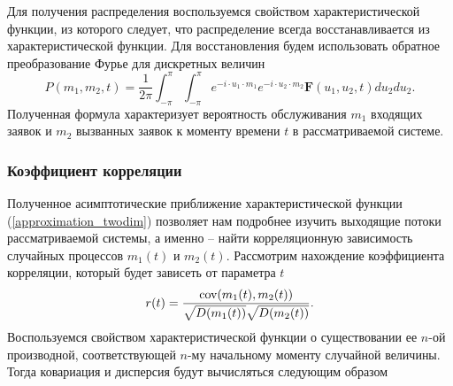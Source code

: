 Для получения распределения воспользуемся свойством характеристической функции, из которого следует, что распределение всегда восстанавливается из характеристической функции. Для восстановления будем использовать обратное преобразование Фурье для дискретных величин
\begin{equation*}
	P(m_{1},m_{2},t) = \dfrac{1}{2\pi}\int_{-\pi}^{\pi}\int_{-\pi}^{\pi} e^{-i \cdot u_{1} \cdot m_{1}} e^{-i \cdot u_{2} \cdot m_{2}}\boldsymbol{F}(u_{1},u_{2},t)du_{2}du_{2}.
\end{equation*}
Полученная формула характеризует вероятность обслуживания $m_{1}$ входящих заявок и $m_{2}$ вызванных заявок к моменту времени $t$ в рассматриваемой системе.

\subsubsection{Коэффициент корреляции}
Полученное асимптотические приближение характеристической функции (\ref{approximation_twodim}) позволяет нам подробнее изучить выходящие потоки рассматриваемой системы, а именно – найти корреляционную зависимость случайных процессов $m_{1}(t)$ и $m_{2}(t)$.
Рассмотрим нахождение коэффициента корреляции, который будет зависеть от параметра $t$
\begin{equation*}
	r(t) = \frac{\textnormal{cov}(m_{1}(t),m_{2}(t))}{\sqrt{D(m_{1}(t))}\sqrt{D(m_{2}(t))}}.
\end{equation*}
Воспользуемся свойством характеристической функции о существовании ее $n$-ой производной, соответствующей $n$-му начальному моменту случайной величины. Тогда ковариация и дисперсия будут вычисляться следующим образом
